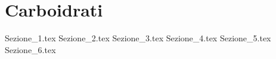 \chapter{Carboidrati}


{Sezione_1.tex} %
{Sezione_2.tex} %
{Sezione_3.tex} %
{Sezione_4.tex} %
{Sezione_5.tex} %
{Sezione_6.tex} %